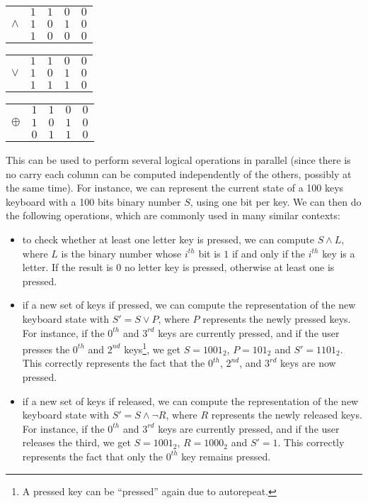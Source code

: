 \setlength{\tabcolsep}{1pt}
\begin{center}
  \begin{tabular}{rrrrr}
             & $1$ & $1$ & $0$ & $0$ \\
    $\wedge$ & $1$ & $0$ & $1$ & $0$ \\
    \hline \makecell{~}
             & $1$ & $0$ & $0$ & $0$
  \end{tabular}
  \hspace{16mm}
  \begin{tabular}{rrrrr}
             & $1$ & $1$ & $0$ & $0$ \\
      $\vee$ & $1$ & $0$ & $1$ & $0$ \\
    \hline \makecell{~}
             & $1$ & $1$ & $1$ & $0$
  \end{tabular}
  \hspace{16mm}
  \begin{tabular}{rrrrr}
             & $1$ & $1$ & $0$ & $0$ \\
    $\oplus$ & $1$ & $0$ & $1$ & $0$ \\
    \hline \makecell{~}
             & $0$ & $1$ & $1$ & $0$
  \end{tabular}
\end{center}
\setlength{\tabcolsep}{\defaulttabcolsep}

This can be used to perform several logical operations in parallel (since there
is no carry each column can be computed independently of the others, possibly
at the same time). For instance, we can represent the current state of a 100
keys keyboard with a 100 bits binary number $S$, using one bit per key. We can
then do the following operations, which are commonly used in many similar
contexts:
\begin{itemize}
  \item to check whether at least one letter key is pressed, we can compute $S
  \wedge L$, where $L$ is the binary number whose $i^{th}$ bit is $1$ if and
  only if the $i^{th}$ key is a letter. If the result is $0$ no letter key is
  pressed, otherwise at least one is pressed.

  \item if a new set of keys if pressed, we can compute the representation of
  the new keyboard state with $S' = S \vee P$, where $P$ represents the newly
  pressed keys. For instance, if the $0^{th}$ and $3^{rd}$ keys are currently
  pressed, and if the user presses the $0^{th}$ and $2^{nd}$ keys\footnote{A
  pressed key can be ``pressed'' again due to autorepeat.}, we get $S=1001_2$,
  $P=101_2$ and $S'=1101_2$. This correctly represents the fact that the
  $0^{th}$, $2^{nd}$, and $3^{rd}$ keys are now pressed.

  \item if a new set of keys if released, we can compute the representation of
  the new keyboard state with $S' = S \wedge \neg R$, where $R$ represents the
  newly released keys. For instance, if the $0^{th}$ and $3^{rd}$ keys are
  currently pressed, and if the user releases the third, we get $S=1001_2$,
  $R=1000_2$ and $S'=1$. This correctly represents the fact that only the
  $0^{th}$ key remains pressed.
\end{itemize}

